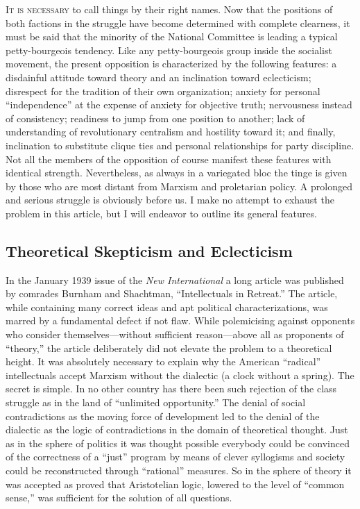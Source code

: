 \label{1939-12-15_a-petty-bourgeois-opposition-in-the-socialist-workers-party}

\noindent
\textsc{It is necessary} to call things by their right names. Now that the positions of both factions in the struggle have become determined with complete clearness, it must be said that the minority of the National Committee is leading a typical petty-bourgeois tendency. Like any petty-bourgeois group inside the socialist movement, the present opposition is characterized by the following features: a disdainful attitude toward theory and an inclination toward eclecticism; disrespect for the tradition of their own organization; anxiety for personal “independence” at the expense of anxiety for objective truth; nervousness instead of consistency; readiness to jump from one position to another; lack of understanding of revolutionary centralism and hostility toward it; and finally, inclination to substitute clique ties and personal relationships for party discipline. Not all the members of the opposition of course manifest these features with identical strength. Nevertheless, as always in a variegated bloc the tinge is given by those who are most distant from Marxism and proletarian policy. A prolonged and serious struggle is obviously before us. I make no attempt to exhaust the problem in this article, but I will endeavor to outline its general features.

\subsection*{Theoretical Skepticism and Eclecticism}

In the January 1939 issue of the \emph{New International} a long article was published by comrades Burnham and Shachtman, ``Intellectuals in Retreat.'' The article, while containing many correct ideas and apt political characterizations, was marred by a fundamental defect if not flaw. While polemicising against opponents who consider themselves---without sufficient reason---above all as proponents of “theory,” the article deliberately did not elevate the problem to a theoretical height. It was absolutely necessary to explain why the American “radical” intellectuals accept Marxism without the dialectic (a clock without a spring). The secret is simple. In no other country has there been such rejection of the class struggle as in the land of “unlimited opportunity.” The denial of social contradictions as the moving force of development led to the denial of the dialectic as the logic of contradictions in the domain of theoretical thought. Just as in the sphere of politics it was thought possible everybody could be convinced of the correctness of a “just” program by means of clever syllogisms and society could be reconstructed through “rational” measures. So in the sphere of theory it was accepted as proved that Aristotelian logic, lowered to the level of ``common sense,'' was sufficient for the solution of all questions.

